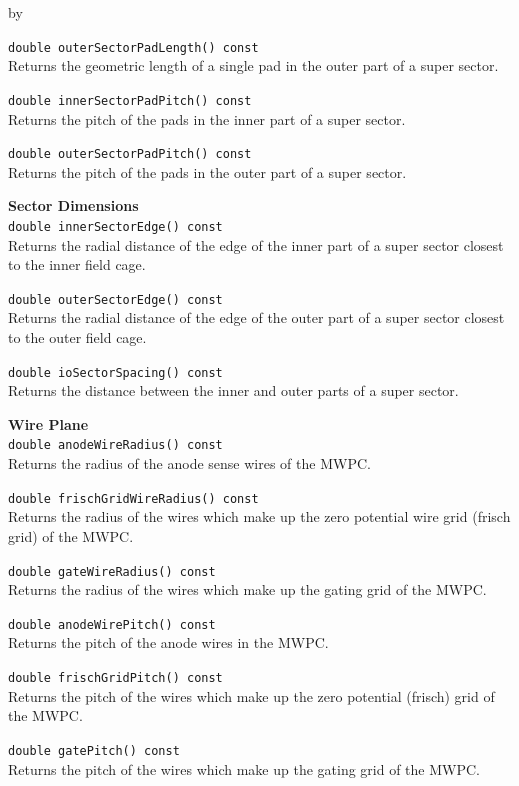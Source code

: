 \documentclass[twoside]{article}
\newcommand{\entrylabel}[1]{\mbox{\textbf{{#1}}}\hfil}%
\newenvironment{entry}
{\begin{list}{}%
    {\renewcommand{\makelabel}{\entrylabel}%
     \setlength{\labelwidth}{90pt}%
     \setlength{\leftmargin}{\labelwidth}
     \advance\leftmargin by \labelsep%
      }%
    }%
  {\end{list}}
\newcommand{\Entrylabel}[1]%
{\raisebox{0pt}[1ex][0pt]{\makebox[\labelwidth][l]%
    {\parbox[t]{\labelwidth}{\hspace{0pt}\textbf{{#1}}}}}}
\newenvironment{Entry}%
{\renewcommand{\entrylabel}{\Entrylabel}\begin{entry}}%
  {\end{entry}}
\begin{document}
\begin{Entry}
  \verb+double outerSectorPadLength() const+\\
  Returns the geometric length of a single pad in the outer
  part of a super sector.

  \verb+double innerSectorPadPitch() const+\\
  Returns the pitch of the pads in the inner part of a
  super sector.

  \verb+double outerSectorPadPitch() const+\\
  Returns the pitch of the pads in the outer part of a
  super sector.

  {\bf Sector Dimensions \\}
  \verb+double innerSectorEdge() const+\\
  Returns the radial distance of the edge of the inner
  part of a super sector closest to the inner field cage.

  \verb+double outerSectorEdge() const+\\
  Returns the radial distance of the edge of the outer
  part of a super sector closest to the outer field cage.

  \verb+double ioSectorSpacing() const+\\
  Returns the distance between the inner and outer parts
  of a super sector.
    
  {\bf Wire Plane \\}
  \verb+double anodeWireRadius() const+\\
  Returns the radius of the anode sense wires of the
  MWPC.

  \verb+double frischGridWireRadius() const+\\
  Returns the radius of the wires which make up the 
  zero potential wire grid (frisch grid) of the MWPC.

  \verb+double gateWireRadius() const+\\
  Returns the radius of the wires which make up the gating grid
  of the MWPC.
    
  \verb+double anodeWirePitch() const+\\
  Returns the pitch of the anode wires in the MWPC.

  \verb+double frischGridPitch() const+\\
  Returns the pitch of the wires which make up the zero potential
  (frisch) grid of the MWPC.
 
  \verb+double gatePitch() const+\\
  Returns the pitch of the wires which make up the gating grid
  of the MWPC.
    

\end{Entry}
\end{document}
